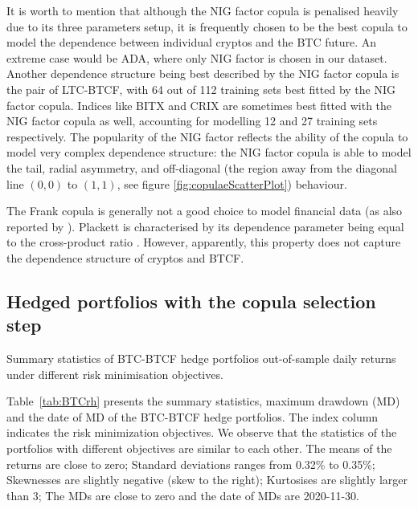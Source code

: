 It is worth to mention that although the NIG factor copula is penalised heavily due to its three parameters setup,
it is frequently chosen to be the best copula to model the dependence
between individual cryptos and the BTC future.
An extreme case would be ADA, where only NIG factor is chosen in our dataset.
Another dependence structure being best described by the NIG factor
copula is the pair of LTC-BTCF, with
64 out of 112 training sets best fitted by the NIG factor copula.
Indices like BITX and CRIX are sometimes best fitted with the NIG
factor copula as well, accounting for modelling 12 and 27 training
sets respectively.
The popularity of the NIG factor reflects the ability of the copula to
model very complex dependence structure: the
NIG factor copula is able to model the tail, radial asymmetry, and
off-diagonal (the region away from the diagonal line $(0,0)$ to $(1,1)$, see figure \ref{fig:copulaeScatterPlot}) behaviour. \medskip

The Frank copula is generally not a good choice to model financial
data (as also reported by \cite{barbi2014copula}).
Plackett is characterised by its dependence parameter being equal to
the cross-product ratio %
. 
However, apparently, this property does not capture the dependence
structure of cryptos and BTCF.


\subsection{Hedged portfolios with the copula selection step}\label{subsec:HP2}
\begin{table}[t] \centering
    
    \caption{Summary statistics of BTC-BTCF hedge portfolios out-of-sample daily returns under different risk minimisation objectives.}
\label{tab:BTCrh}
\end{table}
Table~\ref{tab:BTCrh} presents the summary statistics, maximum drawdown (MD) and the date of MD of the BTC-BTCF hedge portfolios.
The index column indicates the risk minimization objectives.
We observe that the statistics of the portfolios with different objectives are similar to each other.
The means of the returns are close to zero;
Standard deviations ranges from 0.32\% to 0.35\%;
Skewnesses are slightly negative (skew to the right);
Kurtosises are slightly larger than 3;
The MDs are close to zero and the date of MDs are 2020-11-30.


